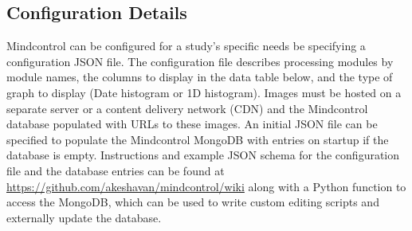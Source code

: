 \subsection{Configuration Details}

Mindcontrol can be configured for a study's specific needs be specifying a configuration JSON file. The configuration file describes processing modules by module names, the columns to display in the data table below, and the type of graph to display (Date histogram or 1D histogram). Images must be hosted on a separate server or a content delivery network (CDN) and the Mindcontrol database populated with URLs to these images. An initial JSON file can be specified to populate the Mindcontrol MongoDB with entries on startup if the database is empty. Instructions and example JSON schema for the configuration file and the database entries can be found at \url{https://github.com/akeshavan/mindcontrol/wiki} along with a Python function to access the MongoDB, which can be used to write custom editing scripts and externally update the database. 

